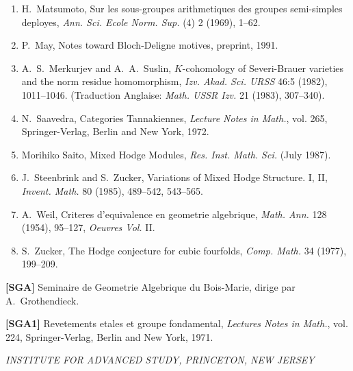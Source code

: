 \documentclass[11pt,a4paper]{article}
\theoremstyle{plain}
\theoremstyle{definition}
\begin{document}
\begin{enumerate}
\item[{[25]}] H.~Matsumoto, Sur les sous-groupes arithmetiques des groupes semi-simples deployes, \textit{Ann. Sci. Ecole Norm. Sup.} (4) 2 (1969), 1--62.

\item[{[26]}] P.~May, Notes toward Bloch-Deligne motives, preprint, 1991.

\item[{[27]}] A.~S.~Merkurjev and A.~A.~Suslin, $K$-cohomology of Severi-Brauer varieties and the norm residue homomorphism, \textit{Izv. Akad. Sci. URSS} 46:5 (1982), 1011--1046. (Traduction Anglaise: \textit{Math. USSR Izv.} 21 (1983), 307--340).

\item[{[28]}] N.~Saavedra, Categories Tannakiennes, \textit{Lecture Notes in Math.}, vol. 265, Springer-Verlag, Berlin and New York, 1972.

\item[{[29]}] Morihiko Saito, Mixed Hodge Modules, \textit{Res. Inst. Math. Sci.} (July 1987).

\item[{[30]}] J.~Steenbrink and S.~Zucker, Variations of Mixed Hodge Structure. I, II, \textit{Invent. Math.} 80 (1985), 489--542, 543--565.

\item[{[31]}] A.~Weil, Criteres d'equivalence en geometrie algebrique, \textit{Math. Ann.} 128 (1954), 95--127, \textit{Oeuvres Vol.} II.

\item[{[32]}] S.~Zucker, The Hodge conjecture for cubic fourfolds, \textit{Comp. Math.} 34 (1977), 199--209.
\end{enumerate}

\vspace{1em}
\noindent\textbf{[SGA]} Seminaire de Geometrie Algebrique du Bois-Marie, dirige par A.~Grothendieck.

\noindent\textbf{[SGA1]} Revetements etales et groupe fondamental, \textit{Lectures Notes in Math.}, vol. 224, Springer-Verlag, Berlin and New York, 1971.

\vspace{2em}
\begin{flushright}
\textit{INSTITUTE FOR ADVANCED STUDY, PRINCETON, NEW JERSEY}
\end{flushright}
\end{document}
